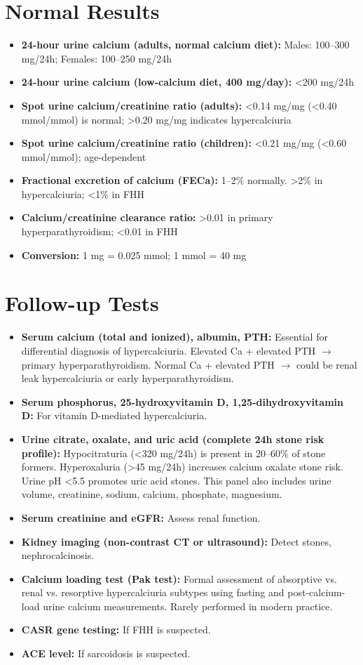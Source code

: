 \section*{Normal Results}
\begin{itemize}
  \item \textbf{24-hour urine calcium (adults, normal calcium diet):} Males: 100--300 mg/24h; Females: 100--250 mg/24h
  \item \textbf{24-hour urine calcium (low-calcium diet, 400 mg/day):} <200 mg/24h
  \item \textbf{Spot urine calcium/creatinine ratio (adults):} <0.14 mg/mg (<0.40 mmol/mmol) is normal; >0.20 mg/mg indicates hypercalciuria
  \item \textbf{Spot urine calcium/creatinine ratio (children):} <0.21 mg/mg (<0.60 mmol/mmol); age-dependent
  \item \textbf{Fractional excretion of calcium (FECa):} 1--2\% normally. >2\% in hypercalciuria; <1\% in FHH
  \item \textbf{Calcium/creatinine clearance ratio:} >0.01 in primary hyperparathyroidism; <0.01 in FHH
  \item \textbf{Conversion:} 1 mg = 0.025 mmol; 1 mmol = 40 mg
\end{itemize}

\section*{Follow-up Tests}
\begin{itemize}
  \item \textbf{Serum calcium (total and ionized), albumin, PTH:} Essential for differential diagnosis of hypercalciuria. Elevated Ca + elevated PTH $\rightarrow$ primary hyperparathyroidism. Normal Ca + elevated PTH $\rightarrow$ could be renal leak hypercalciuria or early hyperparathyroidism.
  \item \textbf{Serum phosphorus, 25-hydroxyvitamin D, 1,25-dihydroxyvitamin D:} For vitamin D-mediated hypercalciuria.
  \item \textbf{Urine citrate, oxalate, and uric acid (complete 24h stone risk profile):} Hypocitraturia (<320 mg/24h) is present in 20--60\% of stone formers. Hyperoxaluria (>45 mg/24h) increases calcium oxalate stone risk. Urine pH <5.5 promotes uric acid stones. This panel also includes urine volume, creatinine, sodium, calcium, phosphate, magnesium.
  \item \textbf{Serum creatinine and eGFR:} Assess renal function.
  \item \textbf{Kidney imaging (non-contrast CT or ultrasound):} Detect stones, nephrocalcinosis.
  \item \textbf{Calcium loading test (Pak test):} Formal assessment of absorptive vs. renal vs. resorptive hypercalciuria subtypes using fasting and post-calcium-load urine calcium measurements. Rarely performed in modern practice.
  \item \textbf{CASR gene testing:} If FHH is suspected.
  \item \textbf{ACE level:} If sarcoidosis is suspected.
\end{itemize}


